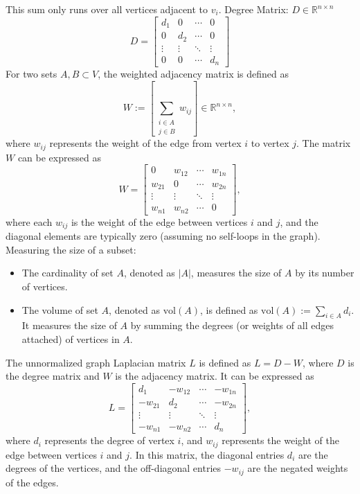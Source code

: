 \documentclass[unicode,11pt,a4paper,oneside,numbers=endperiod,openany]{scrartcl}
\begin{document}
This sum only runs over all vertices adjacent to \( v_i \).\newline
Degree Matrix: \( D \in \mathbb{R}^{n \times n} \)
\[
D = \begin{bmatrix}
 d_1 & 0 & \cdots & 0 \\
 0 & d_2 & \cdots & 0 \\
 \vdots & \vdots & \ddots & \vdots \\
 0 & 0 & \cdots & d_n
\end{bmatrix}
\]
\newline
For two sets \( A, B \subset V \), the weighted adjacency matrix is defined as
\[
 W := \left[\sum_{\substack{i \in A \\ j \in B}} w_{ij}\right] \in \mathbb{R}^{n \times n},
\]
where \( w_{ij} \) represents the weight of the edge from vertex \( i \) to vertex \( j \). The matrix \( W \) can be expressed as
\[
W = \begin{bmatrix}
 0 & w_{12} & \cdots & w_{1n} \\
 w_{21} & 0 & \cdots & w_{2n} \\
 \vdots & \vdots & \ddots & \vdots \\
 w_{n1} & w_{n2} & \cdots & 0
\end{bmatrix},
\]
where each \( w_{ij} \) is the weight of the edge between vertices \( i \) and \( j \), and the diagonal elements are typically zero (assuming no self-loops in the graph).
\newline
Measuring the size of a subset:
\begin{itemize}
    \item The cardinality of set \( A \), denoted as \( |A| \), measures the size of \( A \) by its number of vertices.
    \item The volume of set \( A \), denoted as \( \text{vol}(A) \), is defined as \( \text{vol}(A) := \sum_{i \in A} d_i \). It measures the size of \( A \) by summing the degrees (or weights of all edges attached) of vertices in \( A \).
\end{itemize}
The unnormalized graph Laplacian matrix \( L \) is defined as \( L = D - W \), where \( D \) is the degree matrix and \( W \) is the adjacency matrix. It can be expressed as
\[
L = \begin{bmatrix}
 d_1 & -w_{12} & \cdots & -w_{1n} \\
 -w_{21} & d_2 & \cdots & -w_{2n} \\
 \vdots & \vdots & \ddots & \vdots \\
 -w_{n1} & -w_{n2} & \cdots & d_n
\end{bmatrix},
\]
where \( d_i \) represents the degree of vertex \( i \), and \( w_{ij} \) represents the weight of the edge between vertices \( i \) and \( j \). In this matrix, the diagonal entries \( d_i \) are the degrees of the vertices, and the off-diagonal entries \( -w_{ij} \) are the negated weights of the edges.
\newline
\end{document}
